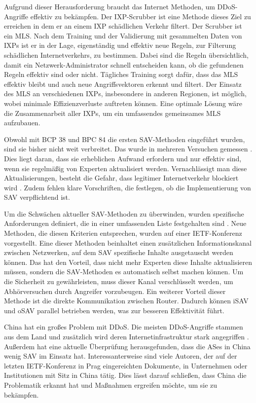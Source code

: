 \documentclass[sigplan,screen]{acmart}
\begin{document}
Aufgrund dieser Herausforderung braucht das Internet Methoden, um DDoS-Angriffe effektiv zu bekämpfen. Der IXP-Scrubber \cite{Hohlfeld01} ist eine Methode dieses Ziel zu erreichen in dem er an einem IXP schädlichen Verkehr filtert. Der Scrubber ist ein MLS. Nach dem Training und der Validierung mit gesammelten Daten von IXPs ist er in der Lage, eigenständig und effektiv neue Regeln, zur Filterung schädlichen Internetverkehrs, zu bestimmen. Dabei sind die Regeln übersichtlich, damit ein Netzwerk-Administrator schnell entscheiden kann, ob die gefundenen Regeln effektiv sind oder nicht. Tägliches Training sorgt dafür, dass das MLS effektiv bleibt und auch neue Angriffsvektoren erkennt und filtert. Der Einsatz des MLS an verschiedenen IXPs, insbesondere in anderen Regionen, ist möglich, wobei minimale Effizienzverluste auftreten können. Eine optimale Lösung wäre die Zusammenarbeit aller IXPs, um ein umfassendes gemeinsames MLS aufzubauen.

Obwohl mit BCP 38 und BPC 84 die ersten SAV-Methoden eingeführt wurden, sind sie bisher nicht weit verbreitet. Das wurde in mehreren Versuchen gemessen \cite{Spoofer01} \cite{CRP01} \cite{largemeasurment01}. Dies liegt daran, dass sie erheblichen Aufwand erfordern und nur effektiv sind, wenn sie regelmäßig von Experten aktualisiert werden. Vernachlässigt man diese Aktualisierungen, besteht die Gefahr, dass legitimer Internetverkehr blockiert wird \cite{SAV_requirements01}. Zudem fehlen klare Vorschriften, die festlegen, ob die Implementierung von SAV verpflichtend ist.

Um die Schwächen aktueller SAV-Methoden zu überwinden, wurden spezifische Anforderungen definiert, die in einer umfassenden Liste festgehalten sind \cite{SAV_requirements01}. Neue Methoden, die diesen Kriterien entsprechen, wurden auf einer IETF-Konferenz vorgestellt. Eine dieser Methoden beinhaltet einen zusätzlichen Informationskanal zwischen Netzwerken, auf dem SAV spezifische Inhalte ausgetauscht werden können. Das hat den Vorteil, dass nicht mehr Experten diese Inhalte aktualisieren müssen, sondern die SAV-Methoden es automatisch selbst machen können. Um die Sicherheit zu gewährleisten, muss dieser Kanal verschlüsselt werden, um Abhörversuchen durch Angreifer vorzubeugen. Ein weiterer Vorteil dieser Methode ist die direkte Kommunikation zwischen Router. Dadurch können iSAV und oSAV parallel betrieben werden, was zur besseren Effektivität führt.

China hat ein großes Problem mit DDoS. Die meisten DDoS-Angriffe stammen aus dem Land \cite{technode01} und zusätzlich wird deren Internetinfrastruktur stark angegriffen \cite{cloudflaeDDoS01}. Außerdem hat eine aktuelle Überprüfung \cite{largemeasurment01} herausgefunden, dass die ASes in China wenig SAV im Einsatz hat. Interessanterweise sind viele Autoren, der auf der letzten IETF-Konferenz in Prag eingereichten Dokumente, in Unternehmen oder Institutionen mit Sitz in China tätig. Dies lässt darauf schließen, dass China die Problematik erkannt hat und Maßnahmen ergreifen möchte, um sie zu bekämpfen.
\end{document}
